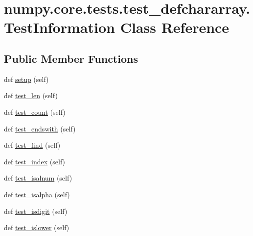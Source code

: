 \hypertarget{classnumpy_1_1core_1_1tests_1_1test__defchararray_1_1TestInformation}{}\section{numpy.\+core.\+tests.\+test\+\_\+defchararray.\+Test\+Information Class Reference}
\label{classnumpy_1_1core_1_1tests_1_1test__defchararray_1_1TestInformation}
\subsection*{Public Member Functions}
\begin{DoxyCompactItemize}
\item 
def \hyperlink{classnumpy_1_1core_1_1tests_1_1test__defchararray_1_1TestInformation_a4386fc7dcf32f87ee1b9d93b478984d6}{setup} (self)
\item 
def \hyperlink{classnumpy_1_1core_1_1tests_1_1test__defchararray_1_1TestInformation_a94d30716b6a8db7ab63d5a2caf288135}{test\+\_\+len} (self)
\item 
def \hyperlink{classnumpy_1_1core_1_1tests_1_1test__defchararray_1_1TestInformation_a52dec262ebd16f94b957f1f515c78366}{test\+\_\+count} (self)
\item 
def \hyperlink{classnumpy_1_1core_1_1tests_1_1test__defchararray_1_1TestInformation_a5995ac60b5624de2385614d27ea60d80}{test\+\_\+endswith} (self)
\item 
def \hyperlink{classnumpy_1_1core_1_1tests_1_1test__defchararray_1_1TestInformation_af21c158fab03c5038104c5ffe645b88d}{test\+\_\+find} (self)
\item 
def \hyperlink{classnumpy_1_1core_1_1tests_1_1test__defchararray_1_1TestInformation_aaa18172742d1223fa1f258a5f7bab301}{test\+\_\+index} (self)
\item 
def \hyperlink{classnumpy_1_1core_1_1tests_1_1test__defchararray_1_1TestInformation_a207b9845867adaf93cbae62ae9bacc69}{test\+\_\+isalnum} (self)
\item 
def \hyperlink{classnumpy_1_1core_1_1tests_1_1test__defchararray_1_1TestInformation_a732158b7987d932678a54fc09caa6599}{test\+\_\+isalpha} (self)
\item 
def \hyperlink{classnumpy_1_1core_1_1tests_1_1test__defchararray_1_1TestInformation_a1667fc7691abac56ec2bbf37954732a4}{test\+\_\+isdigit} (self)
\item 
def \hyperlink{classnumpy_1_1core_1_1tests_1_1test__defchararray_1_1TestInformation_ac9fb56b429b7fea48ee403b80a66f454}{test\+\_\+islower} (self)

\end{DoxyCompactItemize}
